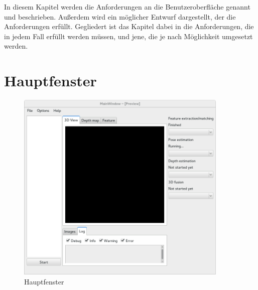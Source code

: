 
In diesem Kapitel werden die Anforderungen an die Benutzeroberfläche genannt und beschrieben. Außerdem wird ein möglicher Entwurf dargestellt, der die Anforderungen erfüllt. Gegliedert ist das Kapitel dabei in die Anforderungen, die in jedem Fall erfüllt werden müssen, und jene, die je nach Möglichkeit umgesetzt werden.

\section{Hauptfenster}

\begin{figure}[h]
	\centering
	\includegraphics[width=0.9\textwidth]{img/Screenshot.png}
	\caption{Hauptfenster}
	\label{fig:Hauptfenster}
\end{figure}

